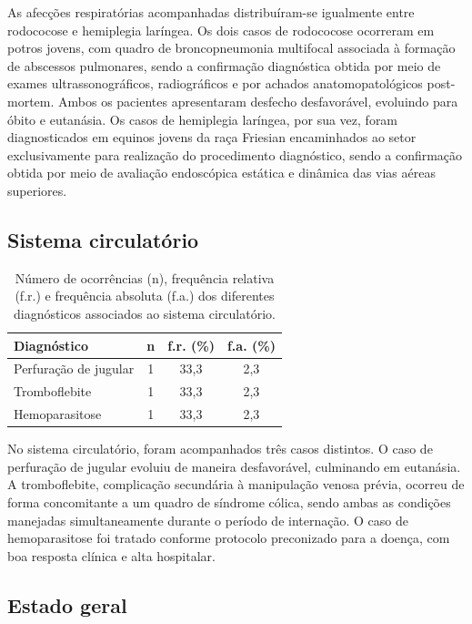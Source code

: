 As afecções respiratórias acompanhadas distribuíram-se igualmente entre
rodococose e hemiplegia laríngea. Os dois casos de rodococose ocorreram
em potros jovens, com quadro de broncopneumonia multifocal associada à
formação de abscessos pulmonares, sendo a confirmação diagnóstica obtida
por meio de exames ultrassonográficos, radiográficos e por achados
anatomopatológicos post-mortem. Ambos os pacientes apresentaram desfecho
desfavorável, evoluindo para óbito e eutanásia. Os casos de hemiplegia
laríngea, por sua vez, foram diagnosticados em equinos jovens da raça
Friesian encaminhados ao setor exclusivamente para realização do
procedimento diagnóstico, sendo a confirmação obtida por meio de
avaliação endoscópica estática e dinâmica das vias aéreas superiores.

\subsection{Sistema circulatório}
\label{subsec:circulatorio}

\begin{table}[htb]
  \centering
  \caption{Número de ocorrências (n), frequência relativa (f.r.) e frequência absoluta (f.a.) dos diferentes diagnósticos associados ao sistema circulatório.}
  \label{tab:circulatorio}
  \begin{tabular}{lccc}
    \toprule
    \textbf{Diagnóstico} & \textbf{n} & \textbf{f.r. (\%)} & \textbf{f.a. (\%)} \\
    \midrule
    Perfuração de jugular & 1 & 33,3 & 2,3 \\
    Tromboflebite         & 1 & 33,3 & 2,3 \\
    Hemoparasitose        & 1 & 33,3 & 2,3 \\
    \bottomrule
  \end{tabular}
\end{table}

No sistema circulatório, foram acompanhados três casos distintos. O caso
de perfuração de jugular evoluiu de maneira desfavorável, culminando em
eutanásia. A tromboflebite, complicação secundária à manipulação venosa
prévia, ocorreu de forma concomitante a um quadro de síndrome cólica,
sendo ambas as condições manejadas simultaneamente durante o período de
internação. O caso de hemoparasitose foi tratado conforme protocolo
preconizado para a doença, com boa resposta clínica e alta hospitalar.

\subsection{Estado geral}
\label{subsec:estado-geral}


